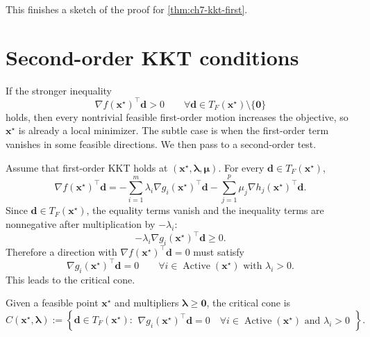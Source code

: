 This finishes a sketch of the proof for \cref{thm:ch7-kkt-first}.


\section{Second-order KKT conditions}
\label{sec:ch7-second-order}
If the stronger inequality
\[
  \nabla f(\mathbf{x}^\star)^\top \mathbf{d}>0
  \qquad \forall \mathbf{d}\in T_F(\mathbf{x}^\star)\setminus\{\mathbf{0}\}
\]
holds, then every nontrivial feasible first-order motion increases the
objective, so $\mathbf{x}^\star$ is already a local minimizer. The subtle case is
when the first-order term vanishes in some feasible directions. We then
pass to a second-order test.

Assume that first-order KKT holds at $(\mathbf{x}^\star,\boldsymbol{\lambda},
\boldsymbol{\mu})$. For every $\mathbf{d}\in T_F(\mathbf{x}^\star)$,
\[
  \nabla f(\mathbf{x}^\star)^\top \mathbf{d}
  = -\sum_{i=1}^m \lambda_i \nabla g_i(\mathbf{x}^\star)^\top \mathbf{d}
  - \sum_{j=1}^p \mu_j \nabla h_j(\mathbf{x}^\star)^\top \mathbf{d}.
\]
Since $\mathbf{d}\in T_F(\mathbf{x}^\star)$, the equality terms vanish and the
inequality terms are nonnegative after multiplication by $-\lambda_i$:
\[
  -\lambda_i \nabla g_i(\mathbf{x}^\star)^\top \mathbf{d}\ge 0.
\]
Therefore a direction with $\nabla f(\mathbf{x}^\star)^\top \mathbf{d} = 0$
must satisfy
\[
  \nabla g_i(\mathbf{x}^\star)^\top \mathbf{d}=0
  \qquad \forall i \in\operatorname{Active}(\mathbf{x}^\star)\text{ with } \lambda_i>0.
\]
This leads to the critical cone.

\begin{definition}
\label{def:ch7-critical-cone}
Given a feasible point $\mathbf{x}^\star$ and multipliers
$\boldsymbol{\lambda}\ge \mathbf{0}$, the critical cone is
\begin{equation}
  \label{eq:ch7-critical-cone}
  C(\mathbf{x}^\star,\boldsymbol{\lambda})
  :=
  \left\{
    \mathbf{d}\in T_F(\mathbf{x}^\star):
    \begin{array}{l}
      \nabla g_i(\mathbf{x}^\star)^\top \mathbf{d}=0 
      \quad \forall i\in\operatorname{Active}(\mathbf{x}^\star) 
      \text{ and } \lambda_i>0
    \end{array}
  \right\}.
\end{equation}
\end{definition}

